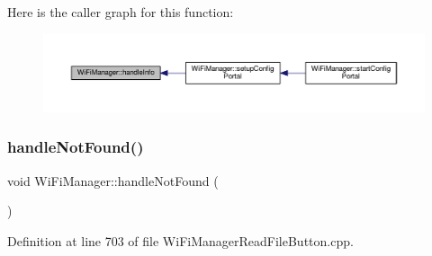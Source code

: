 Here is the caller graph for this function\+:
\nopagebreak
\begin{figure}[H]
\begin{center}
\leavevmode
\includegraphics[width=350pt]{d4/dc8/class_wi_fi_manager_ac35e46661f8a209d84bba62d9aa43a35_icgraph}
\end{center}
\end{figure}
\mbox{\label{class_wi_fi_manager_a7d01f7de3e4b76acdabffac79fa3d0ab}} 
\subsubsection{\texorpdfstring{handle\+Not\+Found()}{handleNotFound()}}
{\footnotesize\ttfamily void Wi\+Fi\+Manager\+::handle\+Not\+Found (\begin{DoxyParamCaption}{ }\end{DoxyParamCaption})\hspace{0.3cm}{\ttfamily [private]}}



Definition at line 703 of file Wi\+Fi\+Manager\+Read\+File\+Button.\+cpp.


